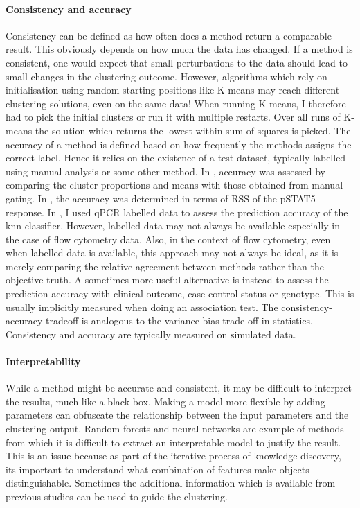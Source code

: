 \paragraph{Consistency and accuracy}
Consistency can be defined as how often does a method return a comparable result.
This obviously depends on how much the data has changed.
If a method is consistent, one would expect that small perturbations to the data should lead to small changes in the clustering outcome.
However, algorithms which rely on initialisation using random starting positions like K-means may reach different clustering solutions, even on the same data!
When running K-means, I therefore had to pick the initial clusters or run it with multiple restarts.
Over all runs of K-means the solution which returns the lowest within-sum-of-squares is picked.
The accuracy of a method is defined based on how frequently the methods assigns the correct label.
Hence it relies on the existence of a test dataset, typically labelled using manual analysis or some other method.
In , accuracy was assessed by comparing the cluster proportions and means with those obtained from manual gating.
In , the accuracy was determined in terms of RSS of the pSTAT5 response.
In , I used qPCR labelled data to assess the prediction accuracy of the \gls{knn} classifier.
However, labelled data may not always be available especially in the case of flow cytometry data.
Also, in the context of flow cytometry, even when labelled data is available, this approach may not always be ideal,
as it is merely comparing the relative agreement between methods rather than the objective truth.
A sometimes more useful alternative is instead to assess the prediction accuracy with clinical outcome, case-control status or genotype.
This is usually implicitly measured when doing an association test.
The consistency-accuracy tradeoff is analogous to the variance-bias trade-off in statistics.
Consistency and accuracy are typically measured on simulated data.

\paragraph{Interpretability}
While a method might be accurate and consistent, it may be difficult to interpret the results, much like a black box.
Making a model more flexible by adding parameters can obfuscate the relationship between the input parameters and the clustering output.
Random forests and neural networks are example of methods from which it is difficult to extract an interpretable model to justify the result.
This is an issue because
as part of the iterative process of knowledge discovery, its important to understand what combination of features make objects distinguishable.
Sometimes the additional information which is available from previous studies can be used to guide the clustering.


